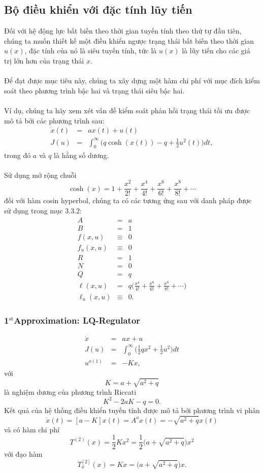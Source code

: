 \documentclass[12pt,a4paper]{report}
\begin{document}
\subsection{Bộ điều khiển với đặc tính lũy tiến}
Đối với hệ động lực bất biến theo thời gian tuyến tính theo thứ tự đầu tiên, chúng ta muốn thiết kế một điều khiển ngược trạng thái bất biến theo thời gian $u(x)$, đặc tính của nó là siêu tuyến tính, tức là $u(x)$ là lũy tiến cho các giá trị lớn hơn của trạng thái $x$.\\\\Để đạt được mục tiêu này, chúng ta xây dựng một hàm chi phí với mục đích kiểm soát theo phương trình bậc hai và trạng thái siêu bậc hai. \\\\
Ví dụ, chúng ta hãy xem xét vấn đề kiểm soát phản hồi trạng thái tối ưu được mô tả bởi các phương trình sau: \begin{eqnarray}
	\dot{x}(t) &=& ax(t) + u(t) \nonumber \\ J(u) &=& \int_{0}^{\infty}\Big(q\cosh(x(t))-q+\frac{1}{2}u^2(t)\Big)dt, \nonumber
\end{eqnarray} trong đó $a$ và $q$ là hằng số dương. \\\\ Sử dụng mở rộng chuỗi $$\cosh(x) = 1 + \frac{x^2}{2!} + \frac{x^4}{4!} + \frac{x^6}{6!} + \frac{x^8}{8!} + \cdots$$ đối với hàm cosin hyperbol, chúng ta có các tương ứng sau với danh pháp được sử dụng trong mục 3.3.2: \begin{eqnarray}
	A&=&a \nonumber\\B&=&1\nonumber\\f(x, u)&\equiv& 0 \nonumber \\ f_u(x, u)&\equiv& 0 \nonumber \\ R&=&1\nonumber\\N&=&0 \nonumber\\Q&=&q\nonumber\\\ell(x, u)&=&q\Big(\frac{x^4}{4!} + \frac{x^6}{6!}+\frac{x^8}{8!} + \cdots\Big) \nonumber\\\ell_u(x, u) &\equiv&0 \nonumber.
\end{eqnarray}
\subsubsection{\textbf{1}$^{\text{st}}$Approximation: LQ-Regulator} \begin{eqnarray}
	\dot{x}&=&ax + u \nonumber\\J(u)&=&\int_{0}^{\infty}\Big(\frac{1}{2}qx^2 + \frac{1}{2}u^2\Big)dt \nonumber\\u^{o(1)}&=&-Kx, \nonumber
\end{eqnarray} với $$K = a + \sqrt{a^2+q}$$ là nghiệm dương của phương trình Riccati $$K^2 - 2aK - q = 0.$$ Kết quả của hệ thống điều khiển tuyến tính được mô tả bởi phương trình vi phân $$\dot{x}(t) = [a - K]x(t) = A^ox(t) = -\sqrt{a^2+q}x(t)$$ và có hàm chi phí $$T^{(2)}(x) = \frac{1}{2}Kx^2 = \frac{1}{2}\Big(a+\sqrt{a^2+q}\Big)x^2$$ với đạo hàm $$T_x^{[2]}(x) = Kx = \Big(a + \sqrt{a^2+q}\Big)x.$$
\end{document}
